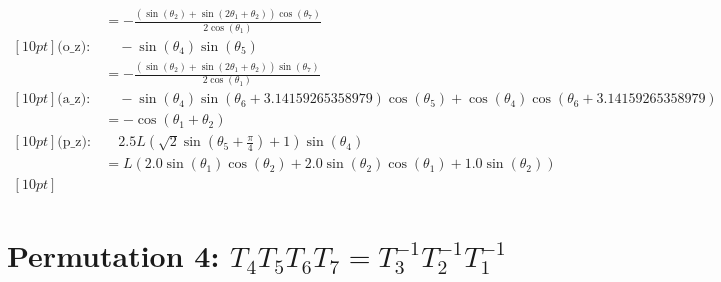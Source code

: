 \documentclass{article}
\begin{document}
\begin{align}
&= - \frac{\left(\sin{\left(\theta_{2} \right)} + \sin{\left(2 \theta_{1} + \theta_{2} \right)}\right) \cos{\left(\theta_{7} \right)}}{2 \cos{\left(\theta_{1} \right)}} \\ [10pt] 
\text{(o_{z})}: & \quad - \sin{\left(\theta_{4} \right)} \sin{\left(\theta_{5} \right)} \\ 
&= - \frac{\left(\sin{\left(\theta_{2} \right)} + \sin{\left(2 \theta_{1} + \theta_{2} \right)}\right) \sin{\left(\theta_{7} \right)}}{2 \cos{\left(\theta_{1} \right)}} \\ [10pt] 
\text{(a_{z})}: & \quad - \sin{\left(\theta_{4} \right)} \sin{\left(\theta_{6} + 3.14159265358979 \right)} \cos{\left(\theta_{5} \right)} + \cos{\left(\theta_{4} \right)} \cos{\left(\theta_{6} + 3.14159265358979 \right)} \\ 
&= - \cos{\left(\theta_{1} + \theta_{2} \right)} \\ [10pt] 
\text{(p_{z})}: & \quad 2.5 L \left(\sqrt{2} \sin{\left(\theta_{5} + \frac{\pi}{4} \right)} + 1\right) \sin{\left(\theta_{4} \right)} \\ 
&= L \left(2.0 \sin{\left(\theta_{1} \right)} \cos{\left(\theta_{2} \right)} + 2.0 \sin{\left(\theta_{2} \right)} \cos{\left(\theta_{1} \right)} + 1.0 \sin{\left(\theta_{2} \right)}\right) \\ [10pt] 
\end{align}

\newpage
\section{Permutation 4: $T_{4}T_{5}T_{6}T_{7} = T_{3}^{-1}T_{2}^{-1}T_{1}^{-1}$}
\end{document}
